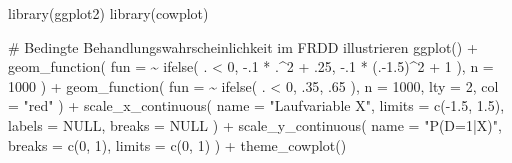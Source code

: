 \documentclass[
  a4paper,
  DIV=11,
  oneside]{scrreprt}
\newenvironment{Shaded}{\begin{snugshade}}{\end{snugshade}}
\newcommand{\AttributeTok}[1]{\textcolor[rgb]{0.40,0.45,0.13}{#1}}
\newcommand{\CommentTok}[1]{\textcolor[rgb]{0.37,0.37,0.37}{#1}}
\newcommand{\ConstantTok}[1]{\textcolor[rgb]{0.56,0.35,0.01}{#1}}
\newcommand{\DecValTok}[1]{\textcolor[rgb]{0.68,0.00,0.00}{#1}}
\newcommand{\FloatTok}[1]{\textcolor[rgb]{0.68,0.00,0.00}{#1}}
\newcommand{\FunctionTok}[1]{\textcolor[rgb]{0.28,0.35,0.67}{#1}}
\newcommand{\NormalTok}[1]{\textcolor[rgb]{0.00,0.23,0.31}{#1}}
\newcommand{\SpecialCharTok}[1]{\textcolor[rgb]{0.37,0.37,0.37}{#1}}
\newcommand{\StringTok}[1]{\textcolor[rgb]{0.13,0.47,0.30}{#1}}
\begin{document}
\begin{Shaded}
\begin{Highlighting}[]
\FunctionTok{library}\NormalTok{(ggplot2)}
\FunctionTok{library}\NormalTok{(cowplot)}

\CommentTok{\# Bedingte Behandlungswahrscheinlichkeit im FRDD illustrieren}
\FunctionTok{ggplot}\NormalTok{() }\SpecialCharTok{+} 
  \FunctionTok{geom\_function}\NormalTok{(}
    \AttributeTok{fun =} \SpecialCharTok{\textasciitilde{}} \FunctionTok{ifelse}\NormalTok{(}
\NormalTok{      . }\SpecialCharTok{\textless{}} \DecValTok{0}\NormalTok{, }
      \SpecialCharTok{{-}}\NormalTok{.}\DecValTok{1} \SpecialCharTok{*}\NormalTok{ .}\SpecialCharTok{\^{}}\DecValTok{2} \SpecialCharTok{+}\NormalTok{ .}\DecValTok{25}\NormalTok{, }
      \SpecialCharTok{{-}}\NormalTok{.}\DecValTok{1} \SpecialCharTok{*}\NormalTok{ (.}\SpecialCharTok{{-}}\FloatTok{1.5}\NormalTok{)}\SpecialCharTok{\^{}}\DecValTok{2} \SpecialCharTok{+} \DecValTok{1}
\NormalTok{    ), }
    \AttributeTok{n =} \DecValTok{1000}
\NormalTok{  ) }\SpecialCharTok{+} 
    \FunctionTok{geom\_function}\NormalTok{(}
    \AttributeTok{fun =} \SpecialCharTok{\textasciitilde{}} \FunctionTok{ifelse}\NormalTok{(}
\NormalTok{      . }\SpecialCharTok{\textless{}} \DecValTok{0}\NormalTok{, }
\NormalTok{     .}\DecValTok{35}\NormalTok{, }
\NormalTok{     .}\DecValTok{65}
\NormalTok{    ),}
    \AttributeTok{n =} \DecValTok{1000}\NormalTok{, }
    \AttributeTok{lty =} \DecValTok{2}\NormalTok{, }
    \AttributeTok{col =} \StringTok{"red"}
\NormalTok{  ) }\SpecialCharTok{+} 
  \FunctionTok{scale\_x\_continuous}\NormalTok{(}
    \AttributeTok{name =} \StringTok{"Laufvariable X"}\NormalTok{, }
    \AttributeTok{limits =} \FunctionTok{c}\NormalTok{(}\SpecialCharTok{{-}}\FloatTok{1.5}\NormalTok{, }\FloatTok{1.5}\NormalTok{),}
    \AttributeTok{labels =} \ConstantTok{NULL}\NormalTok{,}
    \AttributeTok{breaks =} \ConstantTok{NULL}
\NormalTok{  ) }\SpecialCharTok{+}
  \FunctionTok{scale\_y\_continuous}\NormalTok{(}
    \AttributeTok{name =} \StringTok{"P(D=1|X)"}\NormalTok{, }
    \AttributeTok{breaks =} \FunctionTok{c}\NormalTok{(}\DecValTok{0}\NormalTok{, }\DecValTok{1}\NormalTok{), }
    \AttributeTok{limits =} \FunctionTok{c}\NormalTok{(}\DecValTok{0}\NormalTok{, }\DecValTok{1}\NormalTok{)}
\NormalTok{  ) }\SpecialCharTok{+}
  \FunctionTok{theme\_cowplot}\NormalTok{()}
\end{Highlighting}
\end{Shaded}
\end{document}
